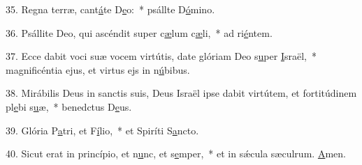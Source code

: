 35. Regna terræ, cant\uline{á}te D\uline{e}o:~* psállte D\uline{ó}mino.\par 
36. Psállite Deo, qui ascéndit super c\uline{æ}lum c\uline{æ}li,~* ad ri\uline{é}ntem.\par 
37. Ecce dabit voci suæ vocem virtútis, date glóriam Deo s\uline{u}per \uline{I}sraël,~* magnificéntia ejus, et virtus ejs in n\uline{ú}bibus.\par 
38. Mirábilis Deus in sanctis suis, Deus Israël ipse dabit virtútem, et fortitúdinem pl\uline{e}bi s\uline{u}æ,~* benedctus D\uline{e}us.\par 
39. Glória P\uline{a}tri, et F\uline{í}lio,~* et Spiríti S\uline{a}ncto.\par 
40. Sicut erat in princípio, et n\uline{u}nc, et s\uline{e}mper,~* et in sǽcula sæculrum. \uline{A}men.\par 
